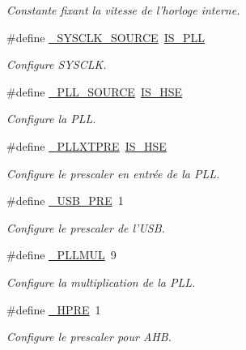 \begin{DoxyCompactItemize}
\begin{DoxyCompactList}\small\item\em Constante fixant la vitesse de l'horloge interne. \end{DoxyCompactList}\item 
\#define \hyperlink{group__conf___c_l_o_c_k_gad975c0a22cc8515304e7cbe6e489ddcd}{\+\_\+\+S\+Y\+S\+C\+L\+K\+\_\+\+S\+O\+U\+R\+C\+E}~\hyperlink{group__conf___c_l_o_c_k_gaaed0ce9b11c552da90ac1cffd3f7c3fb}{I\+S\+\_\+\+P\+L\+L}
\begin{DoxyCompactList}\small\item\em Configure S\+Y\+S\+C\+L\+K. \end{DoxyCompactList}\item 
\#define \hyperlink{group__conf___c_l_o_c_k_ga51dccf37cec784bd3f5230a1e94d9dfa}{\+\_\+\+P\+L\+L\+\_\+\+S\+O\+U\+R\+C\+E}~\hyperlink{group__conf___c_l_o_c_k_gab0b6fc706cd43ac49946f4d5c66a8eb1}{I\+S\+\_\+\+H\+S\+E}
\begin{DoxyCompactList}\small\item\em Configure la P\+L\+L. \end{DoxyCompactList}\item 
\#define \hyperlink{group__conf___c_l_o_c_k_gaa1260de2fa33a5a6d4a7be72132f3049}{\+\_\+\+P\+L\+L\+X\+T\+P\+R\+E}~\hyperlink{group__conf___c_l_o_c_k_gab0b6fc706cd43ac49946f4d5c66a8eb1}{I\+S\+\_\+\+H\+S\+E}
\begin{DoxyCompactList}\small\item\em Configure le prescaler en entrée de la P\+L\+L. \end{DoxyCompactList}\item 
\#define \hyperlink{group__conf___c_l_o_c_k_gad730e10b5d236a647c9e999e72d0e895}{\+\_\+\+U\+S\+B\+\_\+\+P\+R\+E}~1
\begin{DoxyCompactList}\small\item\em Configure le prescaler de l'U\+S\+B. \end{DoxyCompactList}\item 
\#define \hyperlink{group__conf___c_l_o_c_k_ga60db718f30be6916848275c17fa93121}{\+\_\+\+P\+L\+L\+M\+U\+L}~9
\begin{DoxyCompactList}\small\item\em Configure la multiplication de la P\+L\+L. \end{DoxyCompactList}\item 
\#define \hyperlink{group__conf___c_l_o_c_k_ga3d81cc398f3d6af2ad0de7bdcb9ea161}{\+\_\+\+H\+P\+R\+E}~1
\begin{DoxyCompactList}\small\item\em Configure le prescaler pour A\+H\+B. \end{DoxyCompactList}\item 

\end{DoxyCompactItemize}
